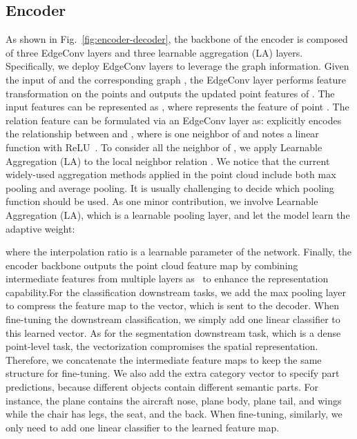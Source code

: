 \documentclass[journal]{IEEEtran}
\begin{document}
\subsection{Encoder}
As shown in Fig.~\ref{fig:encoder-decoder}, the backbone of the encoder is composed of three EdgeConv layers and three learnable aggregation (LA) layers. Specifically, we deploy EdgeConv layers to leverage the graph information. Given the input of  and the corresponding graph , the EdgeConv layer performs feature transformation on the  points and outputs the updated point features of . The input features can be represented as ,  where  represents the feature of point . The relation feature  can be formulated via an EdgeConv layer as:
{\setlength\abovedisplayskip{0.15cm}
     \setlength\belowdisplayskip{0.15cm}
}
explicitly encodes the relationship between  and , where  is one neighbor of  and  notes a linear function with ReLU~\cite{nair2010rectified}.
To consider all the neighbor of , we apply Learnable Aggregation (LA) to the local neighbor relation . 
We notice that the current widely-used aggregation methods applied in the point cloud include both max pooling and average pooling. It is usually challenging to decide which pooling function should be used. As one minor contribution, we involve Learnable Aggregation (LA), which is a learnable pooling layer, and let the model learn the adaptive weight:
    {\setlength\abovedisplayskip{0.15cm}
     \setlength\belowdisplayskip{0.15cm}
    
    }
where the interpolation ratio  is a learnable parameter of the network. 
Finally, the encoder backbone outputs the point cloud feature map by combining intermediate features from multiple layers as~\cite{yang2021multiple} to enhance the representation capability.For the classification downstream tasks, we add the max pooling layer to compress the feature map to the vector, which is sent to the decoder. When fine-tuning the downstream classification, we simply add one linear classifier to this learned vector. 
As for the segmentation downstream task, which is a dense point-level task, the vectorization compromises the spatial representation.  Therefore, we concatenate the intermediate feature maps to keep the same structure for fine-tuning. We also add the extra category vector to specify part predictions, because different objects contain different semantic parts. For instance, the plane contains the aircraft nose, plane body, plane tail, and wings while the chair has legs, the seat, and the back. When fine-tuning, similarly, we only need to add one linear classifier to the learned feature map. 
\end{document}

